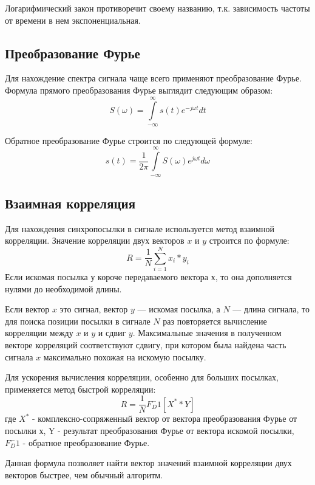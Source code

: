 Логарифмический закон противоречит своему названию, т.к. зависимость частоты от времени в нем экспоненциальная.


\subsection{Преобразование Фурье}
Для нахождение спектра сигнала чаще всего применяют преобразование Фурье.
Формула прямого преобразования Фурье выглядит следующим образом:
\begin{equation}
	S(\omega) = \int \limits_{-\infty}^{\infty} s(t)e^{-j\omega t} dt
\end{equation}

Обратное преобразование Фурье строится по следующей формуле:
\begin{equation}
	s(t) = \frac{1}{2\pi} \int \limits_{-\infty}^{\infty} S(\omega)e^{j\omega t} d\omega
\end{equation}

\subsection{Взаимная корреляция}
Для нахождения синхропосылки в сигнале используется метод взаимной корреляции. 
Значение корреляции двух векторов $x$ и $y$ строится по формуле:
\begin{equation}
	R = \frac {1}{N} \sum \limits_{i=1}^{N} x_i * y_i
\end{equation}
Если искомая посылка у короче передаваемого вектора х, то она дополняется нулями до необходимой длины.

Если вектор $x$ это сигнал, вектор $y$ --- искомая посылка, а $N$ --- длина сигнала, то для поиска позиции посылки 
в сигнале $N$ раз повторяется вычисление корреляции между $x$ и $y$ и сдвиг $y$.
Максимальные значения в полученном векторе корреляций соответствуют сдвигу, при котором была найдена часть
сигнала $x$ максимально похожая на искомую посылку.

Для ускорения вычисления корреляции, особенно для больших посылках, применяется метод быстрой корреляции:
\begin{equation}
	R = \frac{1}{N} F_D^-1 [X^* * Y]
\end{equation}
где $X^*$ - комплексно-сопряженный вектор от вектора преобразования Фурье от посылки х,
 Y - результат преобразования Фурье от вектора искомой посылки, $ F_D^-1$ - обратное преобразование Фурье.

Данная формула позволяет найти вектор значений взаимной корреляции двух векторов быстрее, чем обычный алгоритм.

